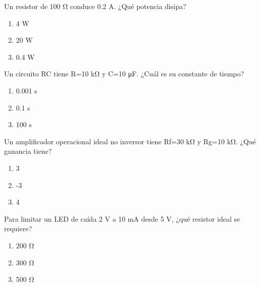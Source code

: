 \noindent\begin{minipage}{\linewidth}\setlength{\parskip}{4pt}\label{q:H-009}
Un resistor de 100 Ω conduce 0.2 A. ¿Qué potencia disipa?
\begin{enumerate}[label=\Alph*),nosep]
\item 4 W
\item 20 W
\item 0.4 W
\end{enumerate}\end{minipage}\par\medskip

\noindent\begin{minipage}{\linewidth}\setlength{\parskip}{4pt}\label{q:H-010}
Un circuito RC tiene R=10 kΩ y C=10 μF. ¿Cuál es su constante de tiempo?
\begin{enumerate}[label=\Alph*),nosep]
\item 0.001 s
\item 0.1 s
\item 100 s
\end{enumerate}\end{minipage}\par\medskip

\noindent\begin{minipage}{\linewidth}\setlength{\parskip}{4pt}\label{q:H-011}
Un amplificador operacional ideal no inversor tiene Rf=30 kΩ y Rg=10 kΩ. ¿Qué ganancia tiene?
\begin{enumerate}[label=\Alph*),nosep]
\item 3
\item -3
\item 4
\end{enumerate}\end{minipage}\par\medskip

\noindent\begin{minipage}{\linewidth}\setlength{\parskip}{4pt}\label{q:H-012}
Para limitar un LED de caída 2 V a 10 mA desde 5 V, ¿qué resistor ideal se requiere?
\begin{enumerate}[label=\Alph*),nosep]
\item 200 Ω
\item 300 Ω
\item 500 Ω
\end{enumerate}\end{minipage}\par\medskip


